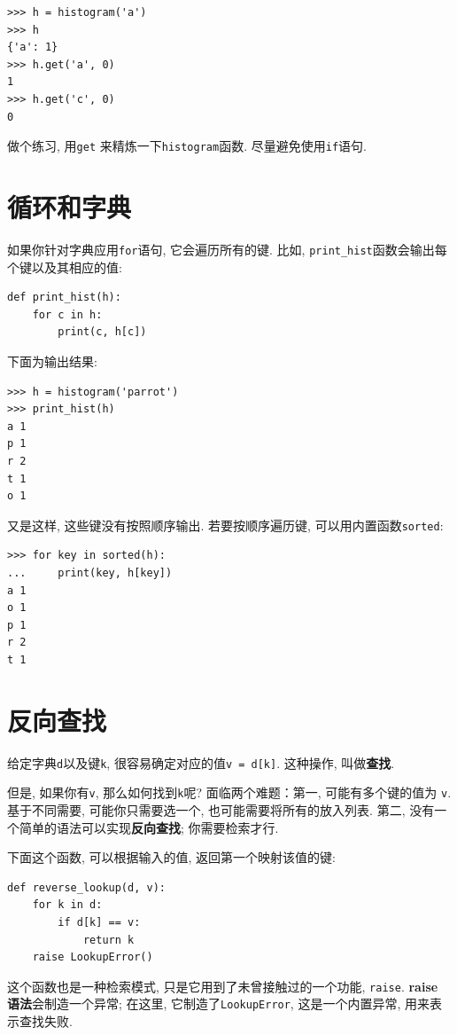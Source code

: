 \documentclass[10pt]{book}
\begin{document}
\begin{verbatim}
>>> h = histogram('a')
>>> h
{'a': 1}
>>> h.get('a', 0)
1
>>> h.get('c', 0)
0
\end{verbatim}
%
做个练习, 用{\tt get} 来精炼一下{\tt histogram}函数. 
尽量避免使用{\tt if}语句. 

\section{循环和字典}

如果你针对字典应用{\tt for}语句, 它会遍历所有的键. 
比如, \verb"print_hist"函数会输出每个键以及其相应的值:

\begin{verbatim}
def print_hist(h):
    for c in h:
        print(c, h[c])
\end{verbatim}
%
下面为输出结果:

\begin{verbatim}
>>> h = histogram('parrot')
>>> print_hist(h)
a 1
p 1
r 2
t 1
o 1
\end{verbatim}
%
又是这样, 这些键没有按照顺序输出. 
若要按顺序遍历键, 可以用内置函数{\tt sorted}:

\begin{verbatim}
>>> for key in sorted(h):
...     print(key, h[key])
a 1
o 1
p 1
r 2
t 1
\end{verbatim}



\section{反向查找}
\label{raise}

给定字典{\tt d}以及键{\tt k}, 很容易确定对应的值{\tt v = d[k]}. 
这种操作, 叫做{\bf 查找}.

但是, 如果你有{\tt v}, 那么如何找到{\tt k}呢?
面临两个难题：第一, 可能有多个键的值为 {\tt v}. 
基于不同需要, 可能你只需要选一个, 也可能需要将所有的放入列表. 
第二, 没有一个简单的语法可以实现{\bf 反向查找}; 你需要检索才行.

下面这个函数, 可以根据输入的值, 返回第一个映射该值的键:

\begin{verbatim}
def reverse_lookup(d, v):
    for k in d:
        if d[k] == v:
            return k
    raise LookupError()
\end{verbatim}
%
这个函数也是一种检索模式, 只是它用到了未曾接触过的一个功能, {\tt raise}. 
{\bf raise 语法}会制造一个异常;
在这里, 它制造了{\tt LookupError}, 这是一个内置异常, 用来表示查找失败. 
  
 
\end{document}
